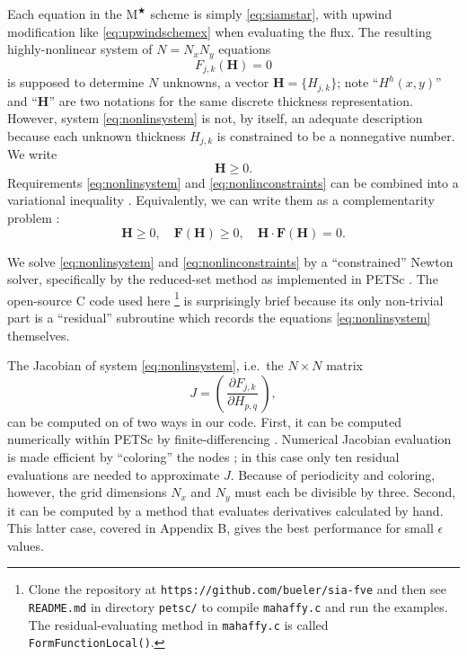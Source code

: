 \documentclass[twocolumn,letterpaper]{igs}
\newcommand\bF{\mathbf{F}}
\newcommand\bH{\mathbf{H}}
\newcommand\eps{\epsilon}
\newcommand{\Mstar}{$\text{M}^{\bigstar}$\xspace}
\begin{document}
Each equation in the \Mstar scheme is simply \eqref{eq:siamstar}, with upwind modification like \eqref{eq:upwindschemex} when evaluating the flux.  The resulting highly-nonlinear system of $N=N_x N_y$ equations
\begin{equation}
F_{j,k}(\bH) = 0   \label{eq:nonlinsystem}
\end{equation}
is supposed to determine $N$ unknowns, a vector $\bH=\{H_{j,k}\}$; note ``$H^h(x,y)$'' and ``$\bH$'' are two notations for the same discrete thickness representation.  However, system \eqref{eq:nonlinsystem} is not, by itself, an adequate description because each unknown thickness $H_{j,k}$ is constrained to be a nonnegative number.  We write
\begin{equation}
\bH \ge 0.  \label{eq:nonlinconstraints}
\end{equation}
Requirements \eqref{eq:nonlinsystem} and \eqref{eq:nonlinconstraints} can be combined into a variational inequality \citep{JouvetBueler2012,KinderlehrerStampacchia1980}.  Equivalently, we can write them as a complementarity problem \citep{BensonMunson2006}:
\begin{equation}
\bH \ge 0, \quad \bF(\bH) \ge 0, \quad \bH \cdot \bF(\bH) = 0.  \label{eq:nonlincomplementarity}
\end{equation}

We solve \eqref{eq:nonlinsystem} and \eqref{eq:nonlinconstraints} by a ``constrained'' Newton solver, specifically by the reduced-set method \citep{BensonMunson2006} as implemented in PETSc \citep{Balayetal2014}.  The open-source C code used here \footnote{Clone the repository at \texttt{https://github.com/bueler/sia-fve} and then see \texttt{README.md} in directory \texttt{petsc/} to compile \texttt{mahaffy.c} and run the examples.  The residual-evaluating method in \texttt{mahaffy.c} is called \texttt{FormFunctionLocal()}.} is surprisingly brief because its only non-trivial part is a ``residual'' subroutine which records the equations \eqref{eq:nonlinsystem} themselves.

The Jacobian of system \eqref{eq:nonlinsystem}, i.e.~the $N\times N$ matrix
\begin{equation}
J = \left(\,\frac{\partial F_{j,k}}{\partial H_{p,q}}\,\right), \label{eq:nonlinjacobian}
\end{equation}
can be computed on of two ways in our code.  First, it can be computed numerically within PETSc by finite-differencing \citep{Kelley2003}.  Numerical Jacobian evaluation is made efficient by ``coloring'' the nodes \citep{CurtisPowellReid1974}; in this case only ten residual evaluations are needed to approximate $J$.  Because of periodicity and coloring, however, the grid dimensions $N_x$ and $N_y$ must each be divisible by three.  Second, it can be computed by a method that evaluates derivatives calculated by hand.  This latter case, covered in Appendix B, gives the best performance for small $\eps$ values. %
\end{document}
